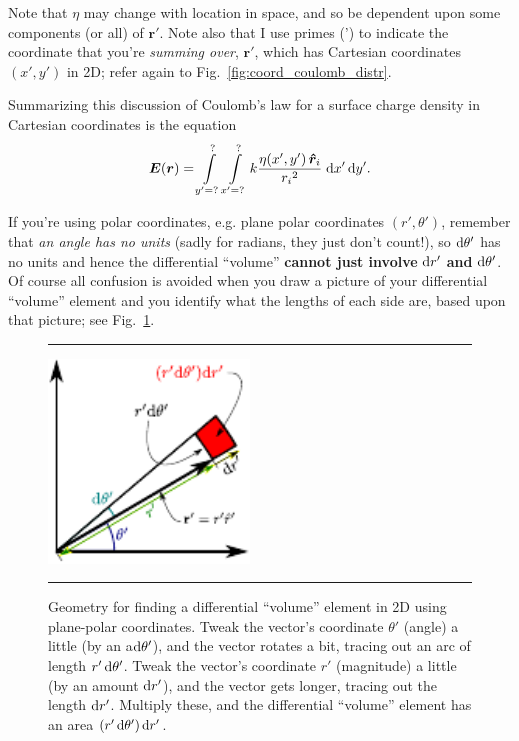 \documentclass[10pt,letterpaper,twoside]{article}
\begin{document}
Note that $\eta$ may change with location in space, and so be dependent upon some components (or all) of $\bm r'$.
Note also that I use primes (') to indicate the coordinate that you're \textit{summing over}, $\bm{r'}$, which has Cartesian coordinates $(x',y')$ in 2D; refer again to Fig.~\ref{fig:coord_coulomb_distr}.

Summarizing this discussion of Coulomb's law for a surface charge density in Cartesian coordinates is the equation
\begin{equation}
  \bm E(\bm r) = \int\limits_{y'=?}^{?}\int\limits_{x'=?}^{?} k\frac{\eta(x',y')\,\bm{\hat r}_i}{{r_i}^2}\;\mathrm{d}x' \, \text d y'.\label{eqn:coulomb2}
\end{equation}

If you're using polar coordinates, e.g. plane polar coordinates $(r',\theta')$, remember that \textit{an angle has no units} (sadly for radians, they just don't count!), so $\text d \theta'$ has no units and hence the differential ``volume'' \textbf{cannot just involve} $\text d r'$ \textbf{and}  $\text d \theta'$.
Of course all confusion is avoided when you draw a picture of your differential ``volume'' element and you identify what the lengths of each side are, based upon that picture; see Fig.~\ref{fig:plane_polar_dr}.

\begin{figure}[htb]
  \centering
  \vspace{5pt}
  \hrule%
  \vspace{10pt}
	\centering
	\includegraphics[keepaspectratio=true,width=2.1in]{./plane_polar_dr.pdf}
    \caption{Geometry for finding a differential ``volume'' element in 2D using plane-polar coordinates.
	         Tweak the vector's coordinate $\theta'$ (angle) a little (by an a\ointmount $\text d \theta'$), and the vector rotates a bit, tracing out an arc of length $r'\,\text d\theta'$.
	         Tweak the vector's coordinate $r'$ (magnitude) a little (by an amount $\text d r'$), and the vector gets longer, tracing out the length $\text d r'$.
			 Multiply these, and the differential ``volume'' element has an area $\left( r'\,\text d \theta' \right)\text d r'$.}
    \label{fig:plane_polar_dr}
  \hrule%
\vspace{5pt}
\end{figure}
\end{document}

